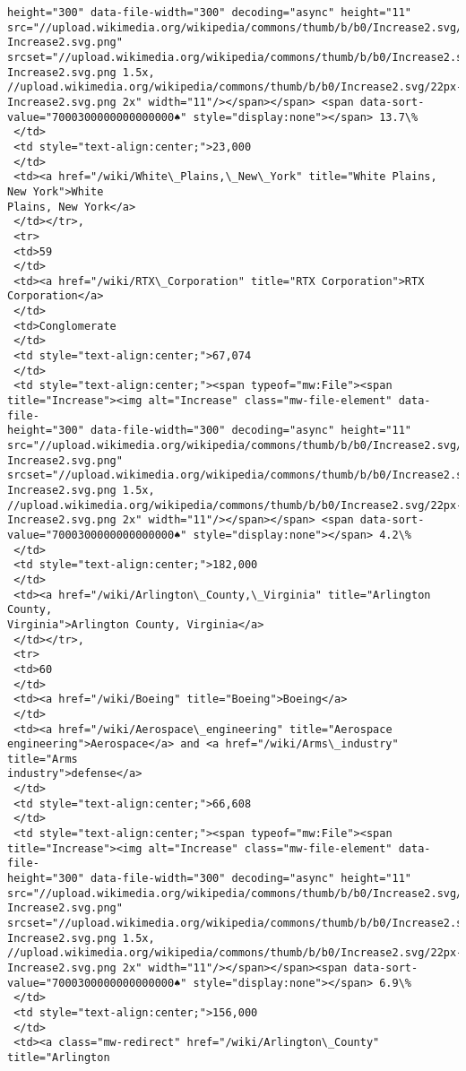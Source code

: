 \documentclass[11pt]{article}
\begin{document}
\begin{tcolorbox}[breakable, size=fbox, boxrule=.5pt, pad at break*=1mm, opacityfill=0]
\begin{Verbatim}[commandchars=\\\{\}]
height="300" data-file-width="300" decoding="async" height="11"
src="//upload.wikimedia.org/wikipedia/commons/thumb/b/b0/Increase2.svg/11px-
Increase2.svg.png"
srcset="//upload.wikimedia.org/wikipedia/commons/thumb/b/b0/Increase2.svg/17px-
Increase2.svg.png 1.5x,
//upload.wikimedia.org/wikipedia/commons/thumb/b/b0/Increase2.svg/22px-
Increase2.svg.png 2x" width="11"/></span></span> <span data-sort-
value="7000300000000000000♠" style="display:none"></span> 13.7\%
 </td>
 <td style="text-align:center;">23,000
 </td>
 <td><a href="/wiki/White\_Plains,\_New\_York" title="White Plains, New York">White
Plains, New York</a>
 </td></tr>,
 <tr>
 <td>59
 </td>
 <td><a href="/wiki/RTX\_Corporation" title="RTX Corporation">RTX Corporation</a>
 </td>
 <td>Conglomerate
 </td>
 <td style="text-align:center;">67,074
 </td>
 <td style="text-align:center;"><span typeof="mw:File"><span
title="Increase"><img alt="Increase" class="mw-file-element" data-file-
height="300" data-file-width="300" decoding="async" height="11"
src="//upload.wikimedia.org/wikipedia/commons/thumb/b/b0/Increase2.svg/11px-
Increase2.svg.png"
srcset="//upload.wikimedia.org/wikipedia/commons/thumb/b/b0/Increase2.svg/17px-
Increase2.svg.png 1.5x,
//upload.wikimedia.org/wikipedia/commons/thumb/b/b0/Increase2.svg/22px-
Increase2.svg.png 2x" width="11"/></span></span> <span data-sort-
value="7000300000000000000♠" style="display:none"></span> 4.2\%
 </td>
 <td style="text-align:center;">182,000
 </td>
 <td><a href="/wiki/Arlington\_County,\_Virginia" title="Arlington County,
Virginia">Arlington County, Virginia</a>
 </td></tr>,
 <tr>
 <td>60
 </td>
 <td><a href="/wiki/Boeing" title="Boeing">Boeing</a>
 </td>
 <td><a href="/wiki/Aerospace\_engineering" title="Aerospace
engineering">Aerospace</a> and <a href="/wiki/Arms\_industry" title="Arms
industry">defense</a>
 </td>
 <td style="text-align:center;">66,608
 </td>
 <td style="text-align:center;"><span typeof="mw:File"><span
title="Increase"><img alt="Increase" class="mw-file-element" data-file-
height="300" data-file-width="300" decoding="async" height="11"
src="//upload.wikimedia.org/wikipedia/commons/thumb/b/b0/Increase2.svg/11px-
Increase2.svg.png"
srcset="//upload.wikimedia.org/wikipedia/commons/thumb/b/b0/Increase2.svg/17px-
Increase2.svg.png 1.5x,
//upload.wikimedia.org/wikipedia/commons/thumb/b/b0/Increase2.svg/22px-
Increase2.svg.png 2x" width="11"/></span></span><span data-sort-
value="7000300000000000000♠" style="display:none"></span> 6.9\%
 </td>
 <td style="text-align:center;">156,000
 </td>
 <td><a class="mw-redirect" href="/wiki/Arlington\_County" title="Arlington

\end{Verbatim}
\end{tcolorbox}
\end{document}
